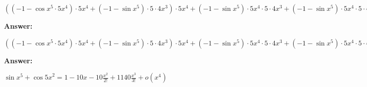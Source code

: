 \documentclass[12pt,a4paper,fleqn]{article}
\theoremstyle{definition}
\begin{document}
$(( -1  - \cos{ x }^{ 5 } \cdot  5 { x }^{ 4 }) \cdot  5 { x }^{ 4 } + ( -1  - \sin{ x }^{ 5 }) \cdot  5  \cdot  4 { x }^{ 3 }) \cdot  5 { x }^{ 4 } + ( -1  - \sin{ x }^{ 5 }) \cdot  5 { x }^{ 4 } \cdot  5  \cdot  4 { x }^{ 3 } + ( -1  - \sin{ x }^{ 5 }) \cdot  5 { x }^{ 4 } \cdot  5  \cdot  4 { x }^{ 3 } + \cos{ x }^{ 5 } \cdot  5  \cdot  4  \cdot  3 { x }^{ 2 } +  2  \cdot ( -1  - ( -1  - \sin 5  x ) \cdot  5  \cdot  5 ) \cdot  5  \cdot \cos 5  x  +  2  \cdot ( -1  - \cos 5  x  \cdot  5 ) \cdot  5  \cdot ( -1  - \sin 5  x ) \cdot  5  +  2  \cdot ( -1  - \cos 5  x  \cdot  5 ) \cdot  5  \cdot ( -1  - \sin 5  x ) \cdot  5  +  2  \cdot ( -1  - \sin 5  x ) \cdot  5  \cdot ( -1  - \cos 5  x  \cdot  5 ) \cdot  5  = (( -1  - \cos{ x }^{ 5 } \cdot  5 { x }^{ 4 }) \cdot  5 { x }^{ 4 } + ( -1  - \sin{ x }^{ 5 }) \cdot  5  \cdot  4 { x }^{ 3 }) \cdot  5 { x }^{ 4 } + ( -1  - \sin{ x }^{ 5 }) \cdot  5 { x }^{ 4 } \cdot  5  \cdot  4 { x }^{ 3 } + ( -1  - \sin{ x }^{ 5 }) \cdot  5 { x }^{ 4 } \cdot  5  \cdot  4 { x }^{ 3 } + \cos{ x }^{ 5 } \cdot  5  \cdot  4  \cdot  3 { x }^{ 2 } +  2  \cdot ( -1  - ( -1  - \sin 5  x ) \cdot  5  \cdot  5 ) \cdot  5  \cdot \cos 5  x  +  2  \cdot ( -1  - \cos 5  x  \cdot  5 ) \cdot  5  \cdot ( -1  - \sin 5  x ) \cdot  5  +  2  \cdot ( -1  - \cos 5  x  \cdot  5 ) \cdot  5  \cdot ( -1  - \sin 5  x ) \cdot  5  +  2  \cdot ( -1  - \sin 5  x ) \cdot  5  \cdot ( -1  - \cos 5  x  \cdot  5 ) \cdot  5 $


\textbf{Answer:}

$(( -1  - \cos{ x }^{ 5 } \cdot  5 { x }^{ 4 }) \cdot  5 { x }^{ 4 } + ( -1  - \sin{ x }^{ 5 }) \cdot  5  \cdot  4 { x }^{ 3 }) \cdot  5 { x }^{ 4 } + ( -1  - \sin{ x }^{ 5 }) \cdot  5 { x }^{ 4 } \cdot  5  \cdot  4 { x }^{ 3 } + ( -1  - \sin{ x }^{ 5 }) \cdot  5 { x }^{ 4 } \cdot  5  \cdot  4 { x }^{ 3 } + \cos{ x }^{ 5 } \cdot  5  \cdot  4  \cdot  3 { x }^{ 2 } +  2  \cdot ( -1  - ( -1  - \sin 5  x ) \cdot  5  \cdot  5 ) \cdot  5  \cdot \cos 5  x  +  2  \cdot ( -1  - \cos 5  x  \cdot  5 ) \cdot  5  \cdot ( -1  - \sin 5  x ) \cdot  5  +  2  \cdot ( -1  - \cos 5  x  \cdot  5 ) \cdot  5  \cdot ( -1  - \sin 5  x ) \cdot  5  +  2  \cdot ( -1  - \sin 5  x ) \cdot  5  \cdot ( -1  - \cos 5  x  \cdot  5 ) \cdot  5 $


\textbf{Answer:}

$\sin{ x }^{ 5 } + {\cos 5  x }^{ 2 } = 1  -10 x  -10 \frac{x^{2}}{2!}+ 1140 \frac{x^{3}}{3!}+ o(x^4)$
\end{document}
